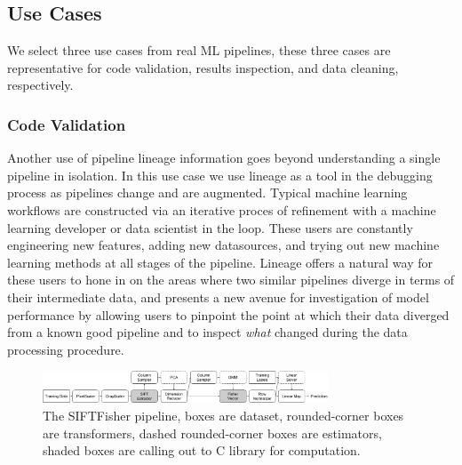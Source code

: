 \documentclass{sig-alternate}
\begin{document}
\subsection{Use Cases}
We select three use cases from real ML pipelines, these three cases are representative for code validation, results inspection, and data cleaning, respectively.

\subsubsection{Code Validation}
Another use of pipeline lineage information goes beyond understanding a single pipeline in isolation.
In this use case we use lineage as a tool in the debugging process as pipelines change and are augmented. 
Typical machine learning workflows are constructed via an iterative proces of refinement with a machine learning developer or data scientist in the loop.
These users are constantly engineering new features, adding new datasources, and trying out new machine learning methods at all stages of the pipeline.
Lineage offers a natural way for these users to hone in on the areas where two similar pipelines diverge in terms of their intermediate data, and presents a new avenue for investigation of model performance by allowing users to pinpoint the point at which their data diverged from a known good pipeline and to inspect \emph{what} changed during the data processing procedure. 


\begin{figure}[ht]
\begin{center}
    \includegraphics[width=85mm]{pictures/VOCSIFTFisher}
    \caption {The SIFTFisher pipeline, boxes are dataset, rounded-corner boxes are transformers, dashed rounded-corner boxes are estimators, shaded boxes are calling out to C library for computation.
    \label{fig:vocsiftfisher}
}
\end{center}
\end{figure}
\end{document}
